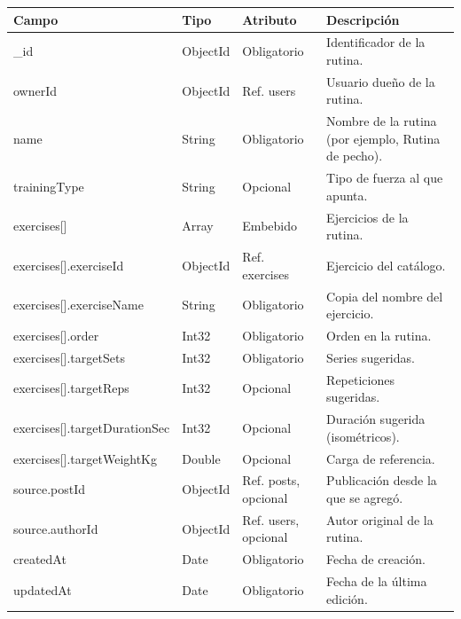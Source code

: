 {\footnotesize
\renewcommand{\arraystretch}{1.2}
\begin{longtable}{|>{\raggedright\arraybackslash}p{4.7cm}|>{\raggedright\arraybackslash}p{1.8cm}|>{\raggedright\arraybackslash}p{2.3cm}|>{\raggedright\arraybackslash}p{5.4cm}|}
    \hline
    \rowcolor[HTML]{EFEFEF}
    \textbf{Campo} & \textbf{Tipo} & \textbf{Atributo} & \textbf{Descripción} \\ \hline
    \endhead
    \_id & ObjectId & Obligatorio & Identificador de la rutina. \\ \hline
    ownerId & ObjectId & Ref. users & Usuario dueño de la rutina. \\ \hline
    name & String & Obligatorio & Nombre de la rutina (por ejemplo, Rutina de pecho). \\ \hline
    trainingType & String & Opcional & Tipo de fuerza al que apunta. \\ \hline
    exercises[]\allowbreak  & Array & Embebido & Ejercicios de la rutina. \\ \hline
    exercises[]\allowbreak .\allowbreak exerciseId & ObjectId & Ref. exercises & Ejercicio del catálogo. \\ \hline
    exercises[]\allowbreak .\allowbreak exerciseName & String & Obligatorio & Copia del nombre del ejercicio. \\ \hline
    exercises[]\allowbreak .\allowbreak order & Int32 & Obligatorio & Orden en la rutina. \\ \hline
    exercises[]\allowbreak .\allowbreak targetSets & Int32 & Obligatorio & Series sugeridas. \\ \hline
    exercises[]\allowbreak .\allowbreak targetReps & Int32 & Opcional & Repeticiones sugeridas. \\ \hline
    exercises[]\allowbreak .\allowbreak targetDurationSec & Int32 & Opcional & Duración sugerida (isométricos). \\ \hline
    exercises[]\allowbreak .\allowbreak targetWeightKg & Double & Opcional & Carga de referencia. \\ \hline
    source.\allowbreak postId & ObjectId & Ref. posts, opcional & Publicación desde la que se agregó. \\ \hline
    source.\allowbreak authorId & ObjectId & Ref. users, opcional & Autor original de la rutina. \\ \hline
    createdAt & Date & Obligatorio & Fecha de creación. \\ \hline
    updatedAt & Date & Obligatorio & Fecha de la última edición. \\ \hline
\end{longtable}
}
